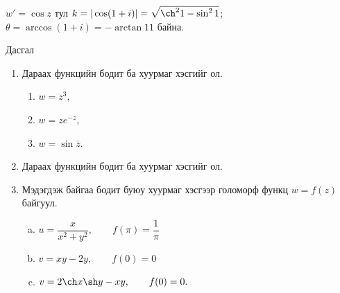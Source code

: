 \begin{sol}
$w'=\cos z$ тул $k=|\cos (1+i)|=\sqrt{ \ch^2 1-\sin^2 1}$; \qquad $\theta = \arccos (1+i)=-\arctan 11$ байна. 
\end{sol}
\begin{center}
    Дасгал
\end{center}
\begin{enumerate}
    \item [13.]
    Дараах функцийн бодит ба хуурмаг хэсгийг ол.
    \colgur
    {\begin{enumerate}
        \item [a)] $w=z^3,$
        \item [b)] $w=ze^{-z},$
        \item [c)] $w=\sin\overline{z}.$
    
    \end{enumerate}}
    \item[14.] Дараах функцийн бодит ба хуурмаг хэсгийг ол.
    \item[15.] Мэдэгдэж байгаа бодит буюу хуурмаг хэсгээр голоморф функц $w= f(z)$ байгуул.
    \begin{enumerate}[a)]
        \item  $u=\dfrac{x}{x^2+y^2}, \qquad f(\pi)=\dfrac{1}{\pi}$
        \item $v=xy-2y, \qquad f(0)=0$
        \item $v=2 \ch x \sh y-xy, \qquad f(0)=0.$
    \end{enumerate}
\end{enumerate}
